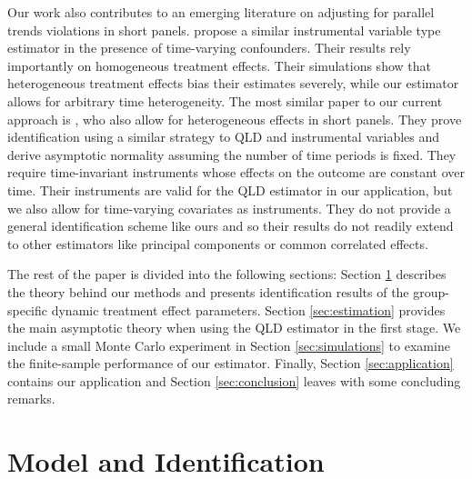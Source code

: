 \documentclass[12pt]{article}
\begin{document}
Our work also contributes to an emerging literature on adjusting for parallel trends violations in short panels. \citet{freyaldenhoven2019pre} propose a similar instrumental variable type estimator in the presence of time-varying confounders. Their results rely importantly on homogeneous treatment effects. Their simulations show that heterogeneous treatment effects bias their estimates severely, while our estimator allows for arbitrary time heterogeneity. The most similar paper to our current approach is \citet{Callaway_Karami_2020}, who also allow for heterogeneous effects in short panels. They prove identification using a similar strategy to QLD and instrumental variables and derive asymptotic normality assuming the number of time periods is fixed. They require time-invariant instruments whose effects on the outcome are constant over time. Their instruments are valid for the QLD estimator in our application, but we also allow for time-varying covariates as instruments. They do not provide a general identification scheme like ours and so their results do not readily extend to other estimators like principal components or common correlated effects.

The rest of the paper is divided into the following sections: Section \ref{sec:theory} describes the theory behind our methods and presents identification results of the group-specific dynamic treatment effect parameters. Section \ref{sec:estimation} provides the main asymptotic theory when using the QLD estimator in the first stage. We include a small Monte Carlo experiment in Section \ref{sec:simulations} to examine the finite-sample performance of our estimator. Finally, Section \ref{sec:application} contains our application and Section \ref{sec:conclusion} leaves with some concluding remarks. 


\section{Model and Identification} \label{sec:theory}
\end{document}

